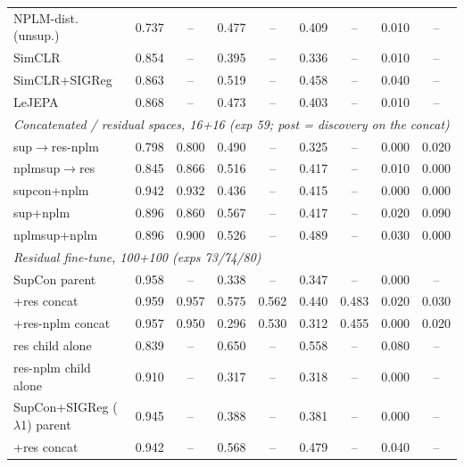\begin{landscape}
\begin{center}
\begin{longtable}{lcccccccc}
\quad NPLM-dist. (unsup.) & 0.737 & -- & 0.477 & -- & 0.409 & -- & 0.010 & -- \\
\quad SimCLR & 0.854 & -- & 0.395 & -- & 0.336 & -- & 0.010 & -- \\
\quad SimCLR+SIGReg & 0.863 & -- & 0.519 & -- & 0.458 & -- & 0.040 & -- \\
\quad LeJEPA & 0.868 & -- & 0.473 & -- & 0.403 & -- & 0.010 & -- \\
\multicolumn{9}{l}{\emph{Concatenated / residual spaces, 16+16 (exp 59; post = discovery on the concat)}} \\
\quad sup$\to$res-nplm & 0.798 & 0.800 & 0.490 & -- & 0.325 & -- & 0.000 & 0.020 \\
\quad nplmsup$\to$res & 0.845 & 0.866 & 0.516 & -- & 0.417 & -- & 0.010 & 0.000 \\
\quad supcon+nplm & 0.942 & 0.932 & 0.436 & -- & 0.415 & -- & 0.000 & 0.000 \\
\quad sup+nplm & 0.896 & 0.860 & 0.567 & -- & 0.417 & -- & 0.020 & 0.090 \\
\quad nplmsup+nplm & 0.896 & 0.900 & 0.526 & -- & 0.489 & -- & 0.030 & 0.000 \\
\multicolumn{9}{l}{\emph{Residual fine-tune, 100+100 (exps 73/74/80)}} \\
\quad SupCon parent & 0.958 & -- & 0.338 & -- & 0.347 & -- & 0.000 & -- \\
\quad\quad +res concat & 0.959 & 0.957 & 0.575 & 0.562 & 0.440 & 0.483 & 0.020 & 0.030 \\
\quad\quad +res-nplm concat & 0.957 & 0.950 & 0.296 & 0.530 & 0.312 & 0.455 & 0.000 & 0.020 \\
\quad\quad res child alone & 0.839 & -- & 0.650 & -- & 0.558 & -- & 0.080 & -- \\
\quad\quad res-nplm child alone & 0.910 & -- & 0.317 & -- & 0.318 & -- & 0.000 & -- \\
\quad SupCon+SIGReg ($\lambda$1) parent & 0.945 & -- & 0.388 & -- & 0.381 & -- & 0.000 & -- \\
\quad\quad +res concat & 0.942 & -- & 0.568 & -- & 0.479 & -- & 0.040 & -- \\
\end{longtable}
\end{center}
\end{landscape}

